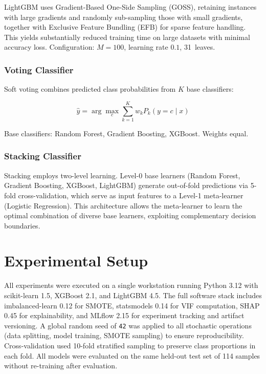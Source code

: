 \documentclass[10pt,letterpaper]{article}
\begin{document}
LightGBM uses Gradient-Based One-Side Sampling (GOSS), retaining instances with large gradients
and randomly sub-sampling those with small gradients, together with Exclusive Feature Bundling
(EFB) for sparse feature handling. This yields substantially reduced training time on large
datasets with minimal accuracy loss. Configuration: $M=100$, learning rate $0.1$, 31~leaves.

\subsubsection{Voting Classifier}

Soft voting combines predicted class probabilities from $K$ base classifiers:

\begin{equation}
    \hat{y} = \arg\max_c \sum_{k=1}^{K} w_k P_k(y = c \mid x)
    \label{eq:voting}
\end{equation}

Base classifiers: Random Forest, Gradient Boosting, XGBoost. Weights equal.

\subsubsection{Stacking Classifier}

Stacking employs two-level learning. Level-0 base learners (Random Forest, Gradient Boosting,
XGBoost, LightGBM) generate out-of-fold predictions via 5-fold cross-validation, which serve as
input features to a Level-1 meta-learner (Logistic Regression). This architecture allows the
meta-learner to learn the optimal combination of diverse base learners, exploiting complementary
decision boundaries.

\section{Experimental Setup}

All experiments were executed on a single workstation running Python 3.12 with scikit-learn 1.5,
XGBoost 2.1, and LightGBM 4.5. The full software stack includes imbalanced-learn 0.12 for SMOTE,
statsmodels 0.14 for VIF computation, SHAP 0.45 for explainability, and MLflow 2.15 for
experiment tracking and artifact versioning. A global random seed of \texttt{42} was applied to
all stochastic operations (data splitting, model training, SMOTE sampling) to ensure
reproducibility. Cross-validation used 10-fold stratified sampling to preserve class proportions
in each fold. All models were evaluated on the same held-out test set of 114 samples without
re-training after evaluation.
\end{document}
